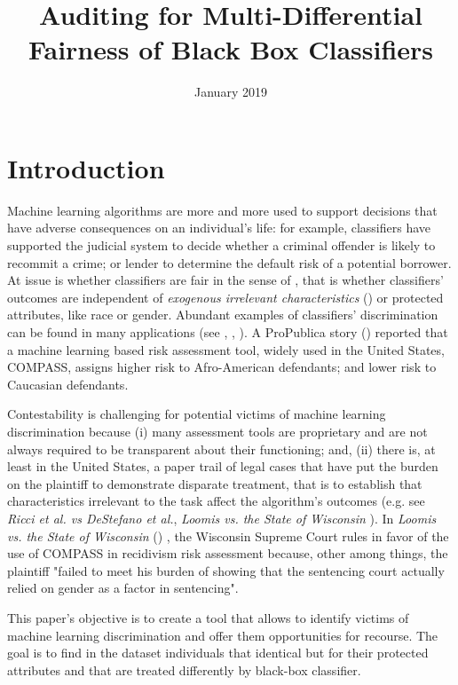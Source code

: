 \documentclass{article}
\title{Auditing for Multi-Differential Fairness of Black Box Classifiers}
\author{}
\date{January 2019}
\begin{document}
\maketitle
\section{Introduction}
Machine learning algorithms are more and more used to support decisions that have adverse consequences on an individual's life: for example, classifiers have supported the judicial system to decide whether a criminal offender is likely to recommit a crime; or lender to determine the default risk of a potential borrower. At issue is whether classifiers are fair in the sense of \cite{calsamiglia2009decentralizing} , that is whether classifiers' outcomes are independent of \textit{exogenous irrelevant characteristics} (\cite{calsamiglia2009decentralizing}) or protected attributes, like race or gender. Abundant examples of classifiers' discrimination can be found in many applications (see \cite{NY2017}, \cite{atlantic2016}, \cite{ProPublica2016}). A ProPublica story (\cite{ProPublica2016}) reported that a machine learning based risk assessment tool, widely used in the United States, COMPASS, assigns higher risk to Afro-American defendants; and lower risk to Caucasian defendants.

\bigskip
Contestability is challenging for potential victims of machine learning discrimination because (i) many assessment tools are proprietary and are not always required to be transparent about their functioning; and, (ii) there is, at least in the United States, a paper trail of legal cases that have put the burden on the plaintiff to demonstrate disparate treatment, that is to establish that characteristics irrelevant to the task affect the algorithm's outcomes (e.g. see \textit{Ricci et al. vs DeStefano et al.}\cite{Ricci}, \textit{Loomis vs. the State of Wisconsin} \cite{Loomis}). In  \textit{Loomis vs. the State of Wisconsin} (\cite{Loomis}) , the Wisconsin Supreme Court rules in favor of the use of COMPASS in recidivism risk assessment because, other among things, the plaintiff "failed to meet his burden of showing that the sentencing court actually relied on gender as a factor in sentencing". 
	
\bigskip
 This paper's objective is to create a tool that allows to identify victims of machine learning discrimination and offer them opportunities for recourse. The goal is to find in the dataset individuals that identical but for their protected attributes and that are treated differently by black-box classifier.
 
\end{document}
